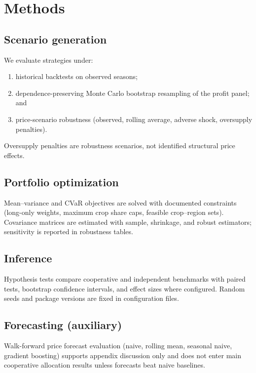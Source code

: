 \section{Methods}
\label{sec:methods}

\subsection{Scenario generation}

We evaluate strategies under:
\begin{enumerate}
  \item historical backtests on observed seasons;
  \item dependence-preserving Monte Carlo bootstrap resampling of the profit panel; and
  \item price-scenario robustness (observed, rolling average, adverse shock, oversupply penalties).
\end{enumerate}
Oversupply penalties are robustness scenarios, not identified structural price effects.

\subsection{Portfolio optimization}

Mean--variance and CVaR objectives are solved with documented constraints (long-only weights,
maximum crop share caps, feasible crop--region sets).
Covariance matrices are estimated with sample, shrinkage, and robust estimators; sensitivity
is reported in robustness tables.


\subsection{Inference}

Hypothesis tests compare cooperative and independent benchmarks with paired tests,
bootstrap confidence intervals, and effect sizes where configured.
Random seeds and package versions are fixed in configuration files.

\subsection{Forecasting (auxiliary)}

Walk-forward price forecast evaluation (naive, rolling mean, seasonal naive, gradient boosting)
supports appendix discussion only and does not enter main cooperative allocation results unless
forecasts beat naive baselines.
